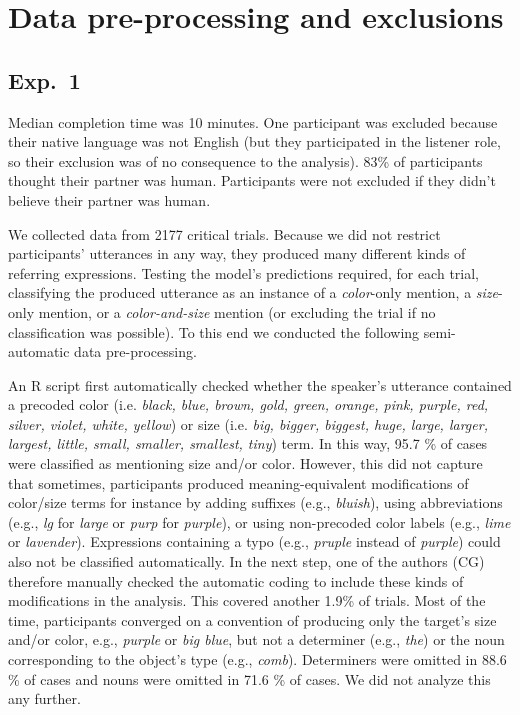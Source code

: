 \documentclass[11pt]{article}
\begin{document}
\section{Data pre-processing and exclusions}
\label{sec:preprocessing}

\subsection{Exp.~1}

Median completion time was 10 minutes. One participant was excluded because their native language was not English (but they participated in the listener role, so their exclusion was of no consequence to the analysis). 83\% of participants thought their partner was human. Participants were not excluded if they didn't believe their partner was human.

We collected data from 2177 critical trials. Because we did not restrict participants' utterances in any way, they produced many different kinds of referring expressions. Testing the model's predictions required, for each trial, classifying the produced utterance as an instance of a \emph{color}-only mention, a \emph{size}-only mention, or a \emph{color-and-size} mention (or excluding the trial if no classification was possible). To this end we conducted the following semi-automatic data pre-processing. 

An R script first automatically checked whether the speaker's utterance contained a precoded color (i.e. \emph{black, blue, brown, gold, green, orange, pink, purple, red, silver, violet, white, yellow}) or size (i.e. \emph{big, bigger, biggest, huge, large, larger, largest, little, small, smaller, smallest, tiny}) term. In this way, 95.7 \% of cases were classified as mentioning size and/or color. However, this did not capture that sometimes, participants produced meaning-equivalent modifications of color/size terms for instance by adding suffixes (e.g., \emph{bluish}), using abbreviations (e.g., \emph{lg} for \emph{large} or \emph{purp} for \emph{purple}), or using non-precoded color labels (e.g., \emph{lime} or \emph{lavender}). Expressions containing a typo (e.g., \emph{pruple} instead of \emph{purple}) could also not be classified automatically. In the next step, one of the authors (CG) therefore manually checked the automatic coding to include these kinds of modifications in the analysis. This covered another 1.9\% of trials. Most of the time, participants converged on a convention of producing only the target's size and/or color, e.g., \emph{purple} or \emph{big blue}, but not a determiner (e.g., \emph{the}) or the noun corresponding to the object's type  (e.g., \emph{comb}). Determiners were omitted in 88.6 \% of cases and nouns were omitted in 71.6 \% of cases. We did not analyze this any further.
\end{document}
